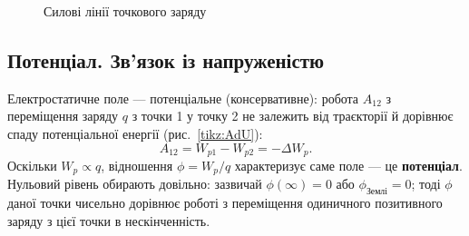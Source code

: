 \begin{figure}[h!]
  \centering
   \def\R{2.5}
  \begin{subfigure}[t]{0.3\linewidth}
    \centering
    \caption{}
    \label{fig:q2}
  \end{subfigure}
  \hspace{2cm}
  \begin{subfigure}[t]{0.3\linewidth}
    \centering
    \caption{}
    \label{fig:qmin}
  \end{subfigure}
  \caption{Силові лінії точкового заряду}
  \label{fig:q}
\end{figure}

\subsection{Потенціал. Зв'язок із напруженістю}

Електростатичне поле --- потенціальне (консервативне): робота $A_{12}$ з переміщення заряду $q$ з точки 1 у точку 2 не залежить від траєкторії й дорівнює спаду потенціальної енергії (рис.~\ref{tikz:AdU}):
\begin{equation}
A_{12} = W_{p1} - W_{p2} = -\Delta W_p.
\end{equation}
Оскільки $W_p\propto q$, відношення $\phi = W_p/q$ характеризує саме поле — це \textbf{потенціал}. Нульовий рівень обирають довільно: зазвичай $\phi(\infty)=0$ або $\phi_{\text{Землі}}=0$; тоді $\phi$ даної точки чисельно дорівнює роботі з переміщення одиничного позитивного заряду з цієї точки в нескінченність.

